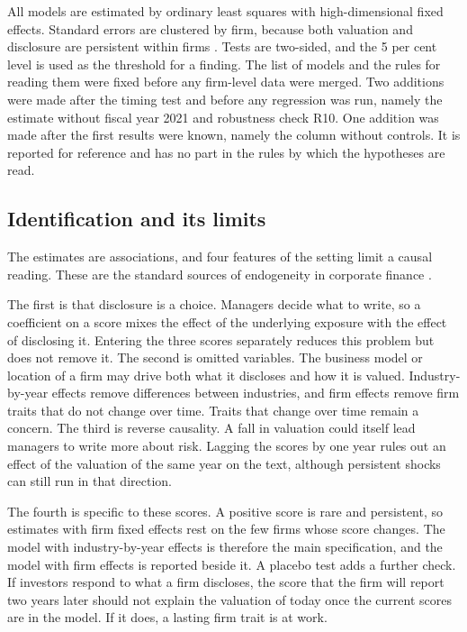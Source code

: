 \documentclass[12pt,a4paper]{article}
\begin{document}
All models are estimated by ordinary least squares with high-dimensional fixed effects. Standard errors are clustered by firm, because both valuation and disclosure are persistent within firms \citep{petersen2009}. Tests are two-sided, and the 5 per cent level is used as the threshold for a finding. The list of models and the rules for reading them were fixed before any firm-level data were merged. Two additions were made after the timing test and before any regression was run, namely the estimate without fiscal year 2021 and robustness check R10. One addition was made after the first results were known, namely the column without controls. It is reported for reference and has no part in the rules by which the hypotheses are read.

\subsection{Identification and its limits}

The estimates are associations, and four features of the setting limit a causal reading. These are the standard sources of endogeneity in corporate finance \citep{roberts2013}.

The first is that disclosure is a choice. Managers decide what to write, so a coefficient on a score mixes the effect of the underlying exposure with the effect of disclosing it. Entering the three scores separately reduces this problem but does not remove it. The second is omitted variables. The business model or location of a firm may drive both what it discloses and how it is valued. Industry-by-year effects remove differences between industries, and firm effects remove firm traits that do not change over time. Traits that change over time remain a concern. The third is reverse causality. A fall in valuation could itself lead managers to write more about risk. Lagging the scores by one year rules out an effect of the valuation of the same year on the text, although persistent shocks can still run in that direction.

The fourth is specific to these scores. A positive score is rare and persistent, so estimates with firm fixed effects rest on the few firms whose score changes. The model with industry-by-year effects is therefore the main specification, and the model with firm effects is reported beside it. A placebo test adds a further check. If investors respond to what a firm discloses, the score that the firm will report two years later should not explain the valuation of today once the current scores are in the model. If it does, a lasting firm trait is at work.
\end{document}
